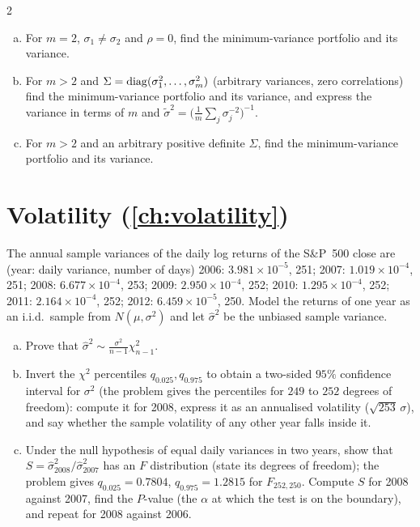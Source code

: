 \begin{paracol}{2}
\begin{exercise}\label{ch10:ex-ps6-5}
\leavevmode
\begin{enumerate}[(a)]
  \item For $m=2$, $\sigma_1\neq\sigma_2$ and $\rho=0$, find the minimum-variance portfolio and its variance.
  \item For $m>2$ and $\Sigma=\operatorname{diag}(\sigma_1^2,\dots,\sigma_m^2)$ (arbitrary variances, zero correlations) find the minimum-variance
      portfolio and its variance, and express the variance in terms of $m$ and $\tilde\sigma^2=\bigl(\frac1m\sum_j\sigma_j^{-2}\bigr)^{-1}$.
  \item For $m>2$ and an arbitrary positive definite $\Sigma$, find the minimum-variance portfolio and its variance.
\end{enumerate}
\end{exercise}

\section{Volatility (\cref{ch:volatility})}\label{exam:ch13}

\begin{exercise}\label{ch13:ex-ps5-4}
The annual sample variances of the daily log returns of the S\&P~500 close are (year: daily variance, number of days)
2006: $3.981\times10^{-5}$, 251; 2007: $1.019\times10^{-4}$, 251; 2008: $6.677\times10^{-4}$, 253; 2009: $2.950\times10^{-4}$, 252; 2010: $1.295\times10^{-4}$, 252; 2011: $2.164\times10^{-4}$, 252; 2012: $6.459\times10^{-5}$, 250.
Model the returns of one year as an i.i.d.\ sample from $N(\mu,\sigma^2)$ and let $\hat\sigma^2$ be the unbiased sample variance.
\begin{enumerate}[(a)]
  \item Prove that $\hat\sigma^2\sim\frac{\sigma^2}{n-1}\chi^2_{n-1}$.
  \item Invert the $\chi^2$ percentiles $q_{0.025},q_{0.975}$ to obtain a two-sided $95\%$ confidence interval for $\sigma^2$ (the problem gives the percentiles for $249$ to $252$ degrees of freedom): compute it for 2008, express it as an annualised volatility ($\sqrt{253}\,\sigma$),
      and say whether the sample volatility of any other year falls inside it.
  \item Under the null hypothesis of equal daily variances in two years, show that $S=\hat\sigma^2_{2008}/\hat\sigma^2_{2007}$ has an $F$ distribution (state its degrees of freedom); the problem gives $q_{0.025}=0.7804$, $q_{0.975}=1.2815$ for $F_{252,250}$. Compute $S$ for 2008 against 2007, find the
      $P$-value (the $\alpha$ at which the test is on the boundary), and repeat for 2008 against 2006.
\end{enumerate}
\end{exercise}


\end{paracol}
